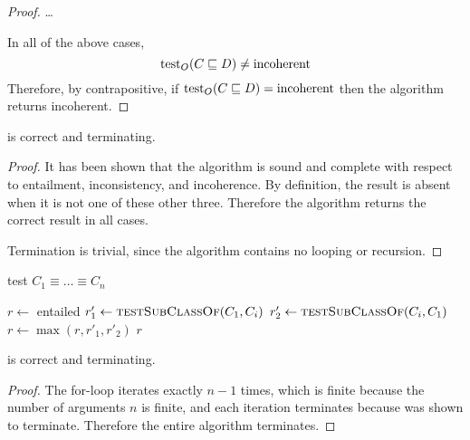 \documentclass[paper.tex]{subfiles}
\begin{document}
\begin{proof}
  \dots \todo

  In all of the above cases,
  \[ \operatorname{test}_O(C \sqsubseteq D) \ne \mathrm{incoherent} \]
  Therefore, by contrapositive, if $\operatorname{test}_O(C \sqsubseteq D) = \mathrm{incoherent}$ then the algorithm returns incoherent.
\end{proof}

\begin{theorem}
   is correct and terminating.
\end{theorem}
\begin{proof}
  It has been shown that the algorithm is sound and complete with respect to entailment, inconsistency, and incoherence.  By definition, the result is absent when it is not one of these other three.  Therefore the algorithm returns the correct result in all cases.

  Termination is trivial, since the algorithm contains no looping or recursion.
\end{proof}


\begin{algorithm}[H]
  \caption{test $C_1 \equiv \ldots \equiv C_n$}
  \begin{algorithmic}[1]
    \raggedright
      \State $r \gets$ entailed
        \State $r'_1 \gets \Call{testSubClassOf}{C_1, C_i}$
        \State $r'_2 \gets \Call{testSubClassOf}{C_i, C_1}$
        \State $r \gets \max(r, r'_1, r'_2)$
      \EndFor
      \State \Return $r$
    \EndFunction
  \end{algorithmic}
\end{algorithm}

\begin{theorem}
   is correct and terminating.
\end{theorem}
\begin{proof}

  The for-loop iterates exactly $n - 1$ times, which is finite because the number of arguments $n$ is finite, and each iteration terminates because  was shown to terminate.  Therefore the entire algorithm terminates.
\end{proof}
\end{document}
